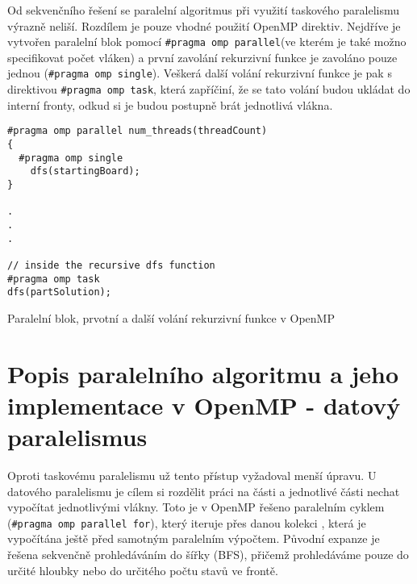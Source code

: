 \documentclass[a4paper,10pt]{article}
\begin{document}
Od sekvenčního řešení se paralelní algoritmus při využití taskového paralelismu výrazně neliší. Rozdílem je pouze vhodné použití OpenMP direktiv. Nejdříve je vytvořen paralelní blok pomocí \texttt{\#pragma omp parallel}(ve kterém je také možno specifikovat počet vláken) a první zavolání rekurzivní funkce je zavoláno pouze jednou (\texttt{\#pragma omp single}). Veškerá další volání rekurzivní funkce je pak s direktivou \texttt{\#pragma omp task}, která zapříčiní, že se tato volání budou ukládat do interní fronty, odkud si je budou postupně brát jednotlivá vlákna.

\begin{listing}[H]
\begin{verbatim}
#pragma omp parallel num_threads(threadCount)
{
  #pragma omp single
    dfs(startingBoard);
}

.
.
.

// inside the recursive dfs function
#pragma omp task
dfs(partSolution);
\end{verbatim}
\caption{Paralelní blok, prvotní a další volání rekurzivní funkce v OpenMP}
\end{listing}

\pagebreak

\section{Popis paralelního algoritmu a jeho implementace v OpenMP - datový paralelismus}

Oproti taskovému paralelismu už tento přístup vyžadoval menší úpravu. U datového paralelismu je cílem si rozdělit práci na části a jednotlivé části nechat vypočítat jednotlivými vlákny. Toto je v OpenMP řešeno paralelním cyklem (\texttt{\#pragma omp parallel for}), který iteruje přes danou kolekci , která je vypočítána ještě před samotným paralelním výpočtem. Původní expanze je řešena sekvenčně prohledáváním do šířky (BFS), přičemž prohledáváme pouze do určité hloubky nebo do určitého počtu stavů ve frontě.
\end{document}
